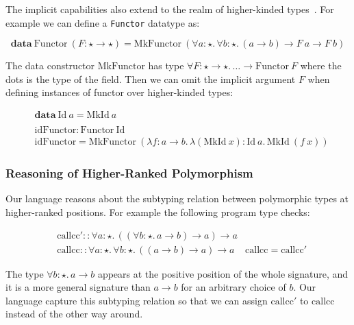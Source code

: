 The implicit capabilities also extend to the realm of higher-kinded types~\cite{}. For example
we can define a \verb|Functor| datatype as:

\newcommand{\Functor}[0]{\mathrm{Functor}}
\newcommand{\MkFunctor}[0]{\mathrm{MkFunctor}}
\newcommand{\Id}[0]{\mathrm{Id}}
\newcommand{\MkId}[0]{\mathrm{MkId}}

\begin{equation*}
  \mathbf{data}~\Functor~(F : \star \rightarrow \star) = \MkFunctor~(\forall a : \star.\, \forall b : \star.\, (a \rightarrow b) \rightarrow F~a \rightarrow F~b)
\end{equation*}

The data constructor $\MkFunctor$ has type $\forall F : \star \rightarrow \star.\, \dots \rightarrow \Functor~F$ where the dots is the type of the field.
Then we can omit the implicit argument $F$ when defining instances of functor over higher-kinded types:

\begin{align*}
  & \mathbf{data}~\mathrm{Id}~a=\mathrm{MkId}~a \\
  \\
  & \mathrm{idFunctor} : \Functor~\Id \\
  & \mathrm{idFunctor} = \MkFunctor~(\lambda f : a \rightarrow b.\, \lambda (\MkId~x) : \Id~a.\, \MkId~(f~x))
\end{align*}

\subsubsection{Reasoning of Higher-Ranked Polymorphism}
\label{sec:higher-ranked-poly}

Our language reasons about the subtyping relation between polymorphic types at
higher-ranked positions. For example the following program type checks:

\begin{align*}
& \mathrm{callcc}' :: \forall a : \star.\, ((\forall b : \star.\, a \rightarrow b) \rightarrow a) \rightarrow a
\\
& \mathrm{callcc} :: \forall a : \star.\, \forall b : \star.\, ((a \rightarrow b) \rightarrow a) \rightarrow a
& \mathrm{callcc} = \mathrm{callcc}'
\end{align*}

The type $\forall b : \star.\, a \rightarrow b$ appears at the positive position
of the whole signature, and it is a more general signature than $a \rightarrow b$
for an arbitrary choice of $b$. Our language capture this subtyping relation so that
 we can assign $\mathrm{callcc}'$ to $\mathrm{callcc}$ instead of the other way around.


